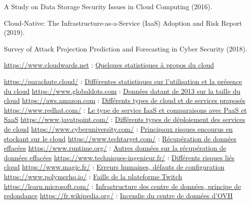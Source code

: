 \documentclass[a4paper, 12pt]{article}
\begin{document}
  \newpage
  \begin{thebibliography}{3}
    A Study on Data Storage Security Issues in Cloud Computing (2016).

    Cloud-Native: The Infrastructure-as-a-Service (IaaS) Adoption and Risk
    Report (2019).

    Survey of Attack Projection Prediction and Forecasting in Cyber Security
    (2018).

    \bibitem{} \url{https://www.cloudwards.net} : \href{https://www.cloudwards.net/cloud-computing-statistics/}{Quelques statistiques à propos du cloud}

    \bibitem{} \url{https://parachute.cloud/} : \href{https://parachute.cloud/cloud-computing-statistics/}{Différentes statistiques sur l'utilisation et la présence du cloud}
    \bibitem{} \url{https://www.globaldots.com} : \href{https://www.globaldots.com/resources/blog/how-much-is-stored-in-the-cloud/}{Données datant de 2013 sur la taille du cloud}
    \bibitem{} \url{https://aws.amazon.com} : \href{https://aws.amazon.com/fr/types-of-cloud-computing/}{Différents types de cloud et de services proposés}
    \bibitem{} \url{https://www.redhat.com/} : \href{https://www.redhat.com/fr/topics/cloud-computing/what-is-iaas}{Le type de service IaaS et comparaisons avec PaaS et SaaS}
    \bibitem{} \url{https://www.javatpoint.com/} : \href{https://www.javatpoint.com/cloud-deployment-model}{Différents types de déploiement des services de cloud}
    \bibitem{} \url{https://www.cyberuniversity.com/} : \href{https://www.cyberuniversity.com/post/la-securite-dans-le-cloud-principaux-risques-et-challenges}{Principaux risques encourus en stockant sur le cloud}
    \bibitem{} \url{https://www.techtarget.com/} : \href{https://www.techtarget.com/searchdisasterrecovery/definition/data-recovery}{Récupération de données effacées}
    \bibitem{} \url{https://www.runtime.org/} : \href{https://www.runtime.org/recoverability.htm}{Autres données sur la récupération de données effacées}
    \bibitem{} \url{https://www.techniques-ingenieur.fr/} : \href{https://www.techniques-ingenieur.fr/actualite/articles/la-securite-dans-le-cloud-une-approche-fournisseur-basee-sur-les-risques-15550/}{Différents risques liés cloud}
    \bibitem{} \url{https://www.magic.fr/} : \href{https://www.magic.fr/cloud-public-les-erreurs-de-configuration-sont-extremement-frequentes/}{Erreurs humaines, défauts de configuration}
    \bibitem{} \url{https://www.polymerhq.io/} : \href{https://www.polymerhq.io/blog/breach/how-did-the-twitch-data-leak-happen/}{Faille de la plateforme Twitch}
    \bibitem{} \url{https://learn.microsoft.com/} : \href{https://learn.microsoft.com/fr-fr/compliance/assurance/assurance-datacenter-architecture-infrastructure}{Infrastructure des centre de données, principe  de redondance}
    \bibitem{} \url{https://fr.wikipedia.org/} : \href{https://fr.wikipedia.org/wiki/Incendie_du_centre_de_donn%C3%A9es_d%27OVHcloud_%C3%A0_Strasbourg}{Incendie du centre de données d'OVH}


\end{thebibliography}
\end{document}
